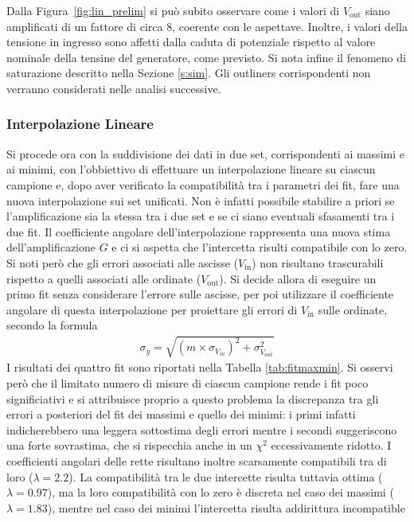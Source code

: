\documentclass[a4paper,11pt]{article}
\begin{document}
Dalla Figura~\ref{fig:lin_prelim} si può subito osservare come i valori di $V_{\text{out}}$ siano amplificati di un
fattore di circa $8$, coerente con le aspettave. Inoltre, i valori della tensione in ingresso sono affetti dalla
caduta di potenziale rispetto al valore nominale della tensine del generatore, come previsto. Si nota infine
il fenomeno di saturazione descritto nella Sezione \ref{s:sim}. Gli outliners corrispondenti non verranno
considerati nelle analisi successive.

\subsubsection{Interpolazione Lineare}\label{s:lin_fit}
Si procede ora con la suddivisione dei dati in due set, corrispondenti ai massimi e ai minimi,
con l'obbiettivo di effettuare un interpolazione lineare su ciascun campione e, dopo aver verificato
la compatibilità tra i parametri dei fit, fare una nuova interpolazione sui set unificati.
Non è infatti possibile stabilire a priori se l'amplificazione sia la stessa tra i due set
e se ci siano eventuali sfasamenti tra i due fit. Il coefficiente angolare dell'interpolazione
rappresenta una nuova stima dell'amplificazione $G$ e ci si aspetta che l'intercetta risulti
compatibile con lo zero.
Si noti però che gli errori associati alle ascisse ($V_{\text{in}}$) non risultano trascurabili rispetto a
quelli associati alle ordinate ($V_{\text{out}}$). Si decide allora di eseguire un primo fit senza considerare
l'errore sulle ascisse, per poi utilizzare il coefficiente angolare di questa interpolazione per proiettare gli errori
di $V_{\text{in}}$ sulle ordinate, secondo la formula
\begin{align}\label{e:proiezione}
 \sigma_{y} = \sqrt{ (m \times \sigma_{V_{in}})^{2} + \sigma_{V_{out}}^{2}}
\end{align}
I risultati dei quattro fit sono riportati nella Tabella \ref{tab:fitmaxmin}. Si osservi però che il limitato numero
di misure di ciascun campione rende i fit poco significiativi e si attribuisce proprio a
questo problema la discrepanza tra gli errori a posteriori del fit dei massimi e quello dei
minimi: i primi infatti indicherebbero una leggera sottostima degli errori mentre i secondi
suggeriscono una forte sovrastima, che si rispecchia anche in un $\chi^{2}$ eccessivamente ridotto. I coefficienti angolari delle rette risultano inoltre scarsamente compatibili tra di loro ($\lambda = 2.2$). La compatibilità tra le due intercette risulta tuttavia ottima ($\lambda = 0.97$), ma la loro compatibilità con lo zero è discreta nel caso dei massimi ($\lambda = 1.83$), mentre nel caso dei minimi l'intercetta risulta addirittura incompatible
\end{document}
